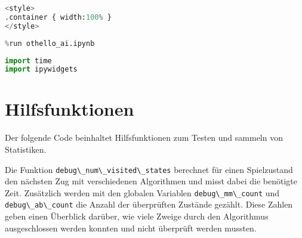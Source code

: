 \begin{lstlisting}[language=Python]
%%HTML
<style>
.container { width:100% }
</style>
\end{lstlisting}

\begin{lstlisting}[language=Python]
%run othello_game.ipynb
%run othello_ai.ipynb
\end{lstlisting}

\begin{lstlisting}[language=Python]
import time
import ipywidgets
\end{lstlisting}

\hypertarget{hilfsfunktionen}{%
\section{Hilfsfunktionen}\label{hilfsfunktionen}}

Der folgende Code beinhaltet Hilfsfunktionen zum Testen und sammeln von
Statistiken.

Die Funktion \passthrough{\lstinline!debug\_num\_visited\_states!}
berechnet für einen Spielzustand den nächsten Zug mit verschiedenen
Algorithmen und misst dabei die benötigte Zeit. Zusätzlich werden mit
den globalen Variablen \passthrough{\lstinline!debug\_mm\_count!} und
\passthrough{\lstinline!debug\_ab\_count!} die Anzahl der überprüften
Zustände gezählt. Diese Zahlen geben einen Überblick darüber, wie viele
Zweige durch den Algorithmus ausgeschlossen werden konnten und nicht
überprüft werden mussten.

